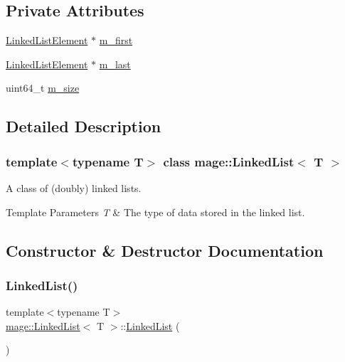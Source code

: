 \subsection*{Private Attributes}
\begin{DoxyCompactItemize}
\item 
\hyperlink{structmage_1_1_linked_list_1_1_linked_list_element}{Linked\+List\+Element} $\ast$ \hyperlink{classmage_1_1_linked_list_a194ecd23a82c83e2735717b32073340c}{m\+\_\+first}
\item 
\hyperlink{structmage_1_1_linked_list_1_1_linked_list_element}{Linked\+List\+Element} $\ast$ \hyperlink{classmage_1_1_linked_list_acb461a96b93fa3917b7ed2e30fe67fce}{m\+\_\+last}
\item 
uint64\+\_\+t \hyperlink{classmage_1_1_linked_list_a1a1be1f46f0bc704e6387833b9528909}{m\+\_\+size}
\end{DoxyCompactItemize}


\subsection{Detailed Description}
\subsubsection*{template$<$typename T$>$\newline
class mage\+::\+Linked\+List$<$ T $>$}

A class of (doubly) linked lists.


\begin{DoxyTemplParams}{Template Parameters}
{\em T} & The type of data stored in the linked list. \\
\hline
\end{DoxyTemplParams}


\subsection{Constructor \& Destructor Documentation}
\hypertarget{classmage_1_1_linked_list_a44b43c51b9515695016c8664d898aa6b}{}\label{classmage_1_1_linked_list_a44b43c51b9515695016c8664d898aa6b} 
\subsubsection{\texorpdfstring{Linked\+List()}{LinkedList()}}
{\footnotesize\ttfamily template$<$typename T$>$ \\
\hyperlink{classmage_1_1_linked_list}{mage\+::\+Linked\+List}$<$ T $>$\+::\hyperlink{classmage_1_1_linked_list}{Linked\+List} (\begin{DoxyParamCaption}{ }\end{DoxyParamCaption})}

